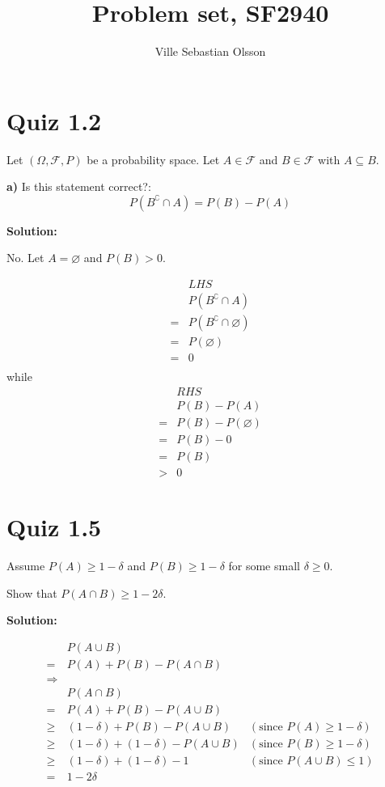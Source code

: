 \documentclass{article}
\title{Problem set, SF2940}
\author{Ville Sebastian Olsson}
\begin{document}
\maketitle

\section{Quiz 1.2}

Let \((\Omega, \mathcal{F}, P)\) be a probability space.
Let \(A\in \mathcal{F}\) and \(B\in \mathcal{F}\)
with \(A\subseteq B\).

\textbf{a)} Is this statement correct?:
\[P(B^\complement \cap A) = P(B)-P(A)\]

\textbf{Solution:}

No. Let \(A=\varnothing\) and \(P(B)>0\).

\begin{align*}
	 & LHS \\
	 & P(B^\complement \cap A) \\
	=& P(B^\complement \cap \varnothing) \\
	=& P(\varnothing) \\
	=& 0 \\
\end{align*}
while
\begin{align*}
	  & RHS \\
	  & P(B)-P(A) \\
	 =& P(B)-P(\varnothing) \\
	 =& P(B)-0 \\
	 =& P(B) \\
	 >& 0
\end{align*}

\section{Quiz 1.5}

Assume
\(P(A) \geq 1-\delta\) and \(P(B) \geq 1-\delta\) for some small \(\delta\geq0\).

Show that \(P(A\cap B) \geq 1-2\delta\).

\textbf{Solution:}

\begin{align*}
	 & P(A\cup B) \\
	=& P(A)+P(B)-P(A\cap B) \\
	\Rightarrow& \\
	 & P(A\cap B) \\
	=& P(A)+P(B)-P(A\cup B) \\
	\geq& (1-\delta)+P(B)-P(A\cup B) & (\text{since }P(A) \geq 1-\delta) \\
	\geq& (1-\delta)+(1-\delta)-P(A\cup B) & (\text{since }P(B) \geq 1-\delta) \\
	\geq& (1-\delta)+(1-\delta)-1 & (\text{since }P(A\cup B) \leq 1) \\
	=& 1-2\delta
\end{align*}
\end{document}
